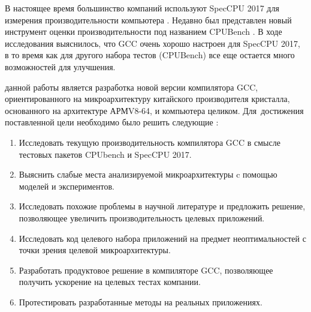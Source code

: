 В настоящее время большинство компаний используют SpecCPU 2017 для измерения производительности компьютера \cite{panda2018wait,bucek2018spec}. Недавно был представлен новый инструмент оценки производительности под названием CPUBench \cite {lu2023cpubench}. В ходе исследования выяснилось, что GCC очень хорошо настроен для SpecCPU 2017, в то время как для другого набора тестов (CPUBench) все еще остается много возможностей для улучшения.



{\aim} данной работы является 
разработка новой версии компилятора GCC, ориентированного на микроархитектуру китайского производителя кристалла, основанного на архитектуре АРМV8-64, 
и компьютера целиком.
Для~достижения поставленной цели необходимо было решить следующие {\tasks}:
\begin{enumerate}[beginpenalty=10000] %
  \item Исследовать текущую производительность  компилятора GCC в смысле тестовых пакетов CPUbench и SpecCPU 2017. 
  \item Выяснить слабые места анализируемой микроархитектуры c помощью моделей и экспериментов.
  \item Исследовать похожие проблемы в научной литературе и предложить решение, позволяющее увеличить производительность целевых приложений.
  \item Исследовать код целевого набора приложений на предмет неоптимальностей с точки зрения целевой микроархитектуры.
  \item Разработать продуктовое решение в компиляторе GCC, позволяющее получить ускорение на целевых тестах компании.
  \item Протестировать разработанные методы на реальных приложениях. 
\end{enumerate}

